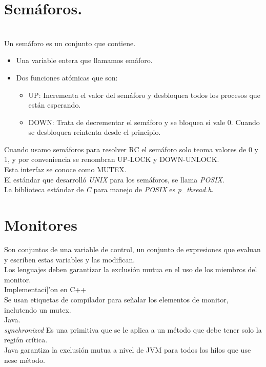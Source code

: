 \section{Sem\'{a}foros.}\\
Un sem\'{a}foro es un conjunto que contiene.
\begin{itemize}
	\item Una variable entera que llamamos em\'{a}foro.
	\item Dos funciones at\'{o}micas que son:
	\begin{itemize}
		\item UP: Incrementa el valor del sem\'{a}foro y desbloquea todos los procesos que est\'{a}n esperando.
		\item DOWN: Trata de decrementar el sem\'{a}foro y se bloquea si vale 0. Cuando se desbloquea reintenta desde el principio.
	\end{itemize}
\end{itemize}
Cuando usamo sem\'{a}foros para resolver RC el sem\'{a}foro solo teoma valores de 0 y 1, y por conveniencia se renombran UP-LOCK y DOWN-UNLOCK.\\
Esta interfaz se conoce como MUTEX.\\
El est\'{a}ndar que desarroll\'{o} \textit{UNIX} para los sem\'{a}foros, se llama \textit{POSIX}.\\
La biblioteca est\'{a}ndar de \textit{C} para manejo de \textit{POSIX} es \textit{p_thread.h}.\\
\section{Monitores}
Son conjuntos de una variable de control, un conjunto de expresiones que evaluan y escriben estas variables y las modifican.\\
Los lenguajes deben garantizar la exclusi\'{o}n mutua en el uso de los miembros del monitor.\\
Implementaci]'{o}n en C++\\
Se usan etiquetas de compilador para se\~{n}alar los elementos de monitor, inclutendo un mutex.\\

Java.\\
\textit{synchronized}
Es una primitiva que se le aplica a un m\'{e}todo que debe tener solo  la regi\'{o}n cr\'{i}tica.\\
Java garantiza la exclusi\'{o}n mutua a nivel de JVM para todos los hilos que use nese m\'{e}todo.\\

